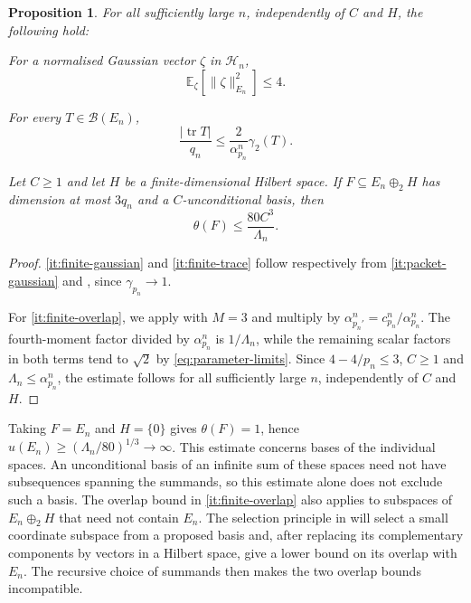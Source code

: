 \documentclass[11pt,a4paper,reqno]{amsart}
\newtheorem{proposition}[proposition]{Proposition}
\theoremstyle{definition}
\newcommand{\norm}[1]{\lVert #1\rVert}
\DeclareMathOperator{\tr}{tr}
\numberwithin{equation}{section}
\begin{document}
\begin{proposition}\label{prop:finite-obstruction}
For all sufficiently large $n$, independently of $C$ and $H$, the following hold:
\begin{resultparts}
\item\label{it:finite-gaussian}
For a normalised Gaussian vector $\zeta$ in $\mathcal H_n$,
\begin{equation*}
 \mathbb E_\zeta[\norm{\zeta}_{E_n}^2]\leq4.
\end{equation*}
\item\label{it:finite-trace}
For every $T\in\mathscr B(E_n)$,
\begin{equation*}
 \frac{|\tr T|}{q_n}\leq\frac2{\alpha_{p_n}^n}\gamma_2(T).
\end{equation*}
\item\label{it:finite-overlap}
Let $C\geq1$ and let $H$ be a finite-dimensional Hilbert space. If $F\subseteq E_n\oplus_2H$ has dimension at most $3q_n$ and a $C$-unconditional basis, then
\begin{equation*}
 \theta(F)\leq\frac{80C^3}{\Lambda_n}.
\end{equation*}
\end{resultparts}
\end{proposition}

\begin{proof}
\ref{it:finite-gaussian} and \ref{it:finite-trace} follow respectively from \ref{it:packet-gaussian} and , since $\gamma_{p_n}\to1$.

For \ref{it:finite-overlap}, we apply  with $M=3$ and multiply by $\alpha_{p_n'}^n=c_{p_n}^n/\alpha_{p_n}^n$. The fourth-moment factor divided by $\alpha_{p_n}^n$ is $1/\Lambda_n$, while the remaining scalar factors in both terms tend to $\sqrt2$ by \eqref{eq:parameter-limits}. Since $4-4/p_n\leq3$, $C\geq1$ and $\Lambda_n\leq \alpha_{p_n}^n$, the estimate follows for all sufficiently large $n$, independently of $C$ and $H$.
\end{proof}

Taking $F=E_n$ and $H=\{0\}$ gives $\theta(F)=1$, hence $u(E_n)\geq(\Lambda_n/80)^{1/3}\to\infty$. This estimate concerns bases of the individual spaces. An unconditional basis of an infinite sum of these spaces need not have subsequences spanning the summands, so this estimate alone does not exclude such a basis. The overlap bound in \ref{it:finite-overlap} also applies to subspaces of $E_n\oplus_2H$ that need not contain $E_n$. The selection principle in  will select a small coordinate subspace from a proposed basis and, after replacing its complementary components by vectors in a Hilbert space, give a lower bound on its overlap with $E_n$. The recursive choice of summands then makes the two overlap bounds incompatible.
\end{document}
